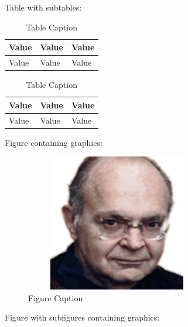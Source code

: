 \documentclass[11pt, english]{article}
\begin{document}
	\newpage

	Table with subtables:

	\begin{table}[h]
	\begin{center}
		\begin{subtable}[t]{4cm}
		\begin{center}
		\begin{tabular}{|l|l|l|}
			\hline
			Value & Value & Value\\
			\hline
			Value & Value & Value\\
			\hline
		\end{tabular}
			\caption{Table Subcaption}
		\end{center}
		\end{subtable}
	\quad
		\begin{subtable}[t]{4cm}
		\begin{center}
		\begin{tabular}{|l|l|l|}
			\hline
			Value & Value & Value\\
			\hline
			Value & Value & Value\\
			\hline
		\end{tabular}
			\caption{Table Subcaption}
		\end{center}
		\end{subtable}
	\end{center}
		\caption{Table Caption}
	\end{table}

	\newpage

	Figure containing graphics:

	\begin{figure}[H]
	\begin{center}
		\includegraphics[width=8cm,height=6cm]{../Blog/Photos_FF/knuth.png}
		\caption{Figure Caption}
	\end{center}
	\end{figure}

	Figure with subfigures containing graphics:
\end{document}

